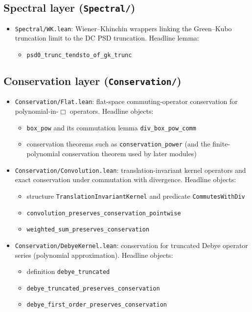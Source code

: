 \documentclass[11pt]{article}
\begin{document}
\subsection{Spectral layer (\texttt{Spectral/})}
\begin{itemize}
\item \texttt{Spectral/WK.lean}: Wiener--Khinchin wrappers linking the Green--Kubo truncation limit to the DC PSD truncation.
Headline lemma:
\begin{itemize}
\item \texttt{psd0\_trunc\_tendsto\_of\_gk\_trunc}
\end{itemize}
\end{itemize}

\subsection{Conservation layer (\texttt{Conservation/})}
\begin{itemize}
\item \texttt{Conservation/Flat.lean}: flat-space commuting-operator conservation for polynomial-in-$\Box$ operators.
Headline objects:
\begin{itemize}
\item \texttt{box\_pow} and its commutation lemma \texttt{div\_box\_pow\_comm}
\item conservation theorems such as \texttt{conservation\_power} (and the finite-polynomial conservation theorem used by later modules)
\end{itemize}

\item \texttt{Conservation/Convolution.lean}: translation-invariant kernel operators and exact conservation under commutation with divergence.
Headline objects:
\begin{itemize}
\item structure \texttt{TranslationInvariantKernel} and predicate \texttt{CommutesWithDiv}
\item \texttt{convolution\_preserves\_conservation\_pointwise}
\item \texttt{weighted\_sum\_preserves\_conservation}
\end{itemize}

\item \texttt{Conservation/DebyeKernel.lean}: conservation for truncated Debye operator series (polynomial approximation).
Headline objects:
\begin{itemize}
\item definition \texttt{debye\_truncated}
\item \texttt{debye\_truncated\_preserves\_conservation}
\item \texttt{debye\_first\_order\_preserves\_conservation}
\end{itemize}
\end{itemize}
\end{document}
